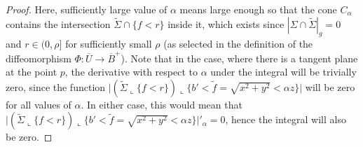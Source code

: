 \documentclass{amsart}
\newcommand{\ts}{\tilde{\Sigma}}
\theoremstyle{named}
\begin{document}
\begin{proof}
    Here, sufficiently large value of $\alpha$ means large enough so that  the cone $C_{\alpha}$ contains the intersection $\ts \cap \{ f < r\}$ inside it, which exists since $|\Sigma \cap \ts|_g = 0$ and $r \in (0,\rho]$ for sufficiently small $\rho$ (as selected in the definition of the diffeomorphism $\Phi: \overline{U} \rightarrow \overline{B}^{+}$). Note that in the case, where there is a tangent plane at the point $p$, the derivative with respect to $\alpha$ under the integral will be trivially zero, since the function $\big| (\ts \llcorner \{ f < r \}) \llcorner \{ b' < \tilde{f} = \sqrt{x^2 + y^2} < \alpha z \} \big|$ will be zero for all values of $\alpha$. In either case, this would mean that $\big| (\ts \llcorner \{ f < r \}) \llcorner \{ b' < \tilde{f} = \sqrt{x^2 + y^2} < \alpha z \} \big|'_{\alpha} = 0$, hence the integral will also be zero.
    

\end{proof}
\end{document}
